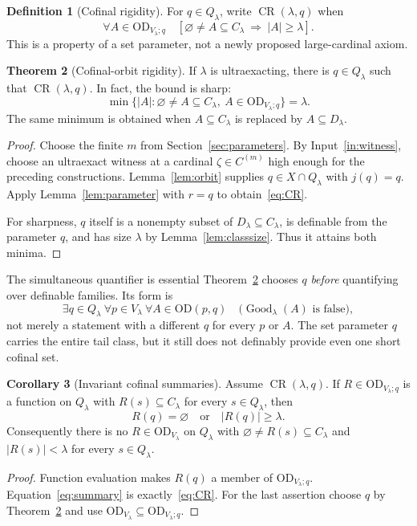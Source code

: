 \documentclass[11pt,letterpaper]{article}
\theoremstyle{definition}
\newtheorem{definition}{Definition}[section]
\newtheorem{theorem}[definition]{Theorem}
\newtheorem{corollary}[definition]{Corollary}
\numberwithin{equation}{section}
\newcommand{\OD}{\mathrm{OD}}
\newcommand{\D}{D_\lambda}
\newcommand{\Q}{Q_\lambda}
\newcommand{\C}{C_\lambda}
\newcommand{\ODlow}{\OD_{V_\lambda}}
\newcommand{\ODq}{\OD_{V_\lambda;q}}
\newcommand{\Good}{\operatorname{Good}}
\newcommand{\Rig}{\operatorname{CR}}
\begin{document}
\begin{definition}[Cofinal rigidity]\label{def:rigid}
For $q\in\Q$, write $\Rig(\lambda,q)$ when
\begin{equation}
\forall A\in\ODq\quad
\left[\varnothing\ne A\subseteq\C\ \Longrightarrow\ |A|\ge\lambda\right].
\label{eq:CR}
\end{equation}
This is a property of a set parameter, not a newly proposed large-cardinal axiom.
\end{definition}

\begin{theorem}[Cofinal-orbit rigidity]\label{thm:rigid}
If $\lambda$ is ultraexacting, there is $q\in\Q$ such that $\Rig(\lambda,q)$. In fact, the bound is sharp:
\begin{equation}
\min\bigl\{|A|:\varnothing\ne A\subseteq\C,\ A\in\ODq\bigr\}
=\lambda.
\label{eq:minimum}
\end{equation}
The same minimum is obtained when $A\subseteq\C$ is replaced by $A\subseteq\D$.
\end{theorem}
\begin{proof}
Choose the finite $m$ from Section~\ref{sec:parameters}. By Input~\ref{in:witness}, choose an ultraexact witness at a cardinal $\zeta\in C^{(m)}$ high enough for the preceding constructions. Lemma~\ref{lem:orbit} supplies $q\in X\cap\Q$ with $j(q)=q$. Apply Lemma~\ref{lem:parameter} with $r=q$ to obtain~\eqref{eq:CR}.

For sharpness, $q$ itself is a nonempty subset of $\D\subseteq\C$, is definable from the parameter $q$, and has size $\lambda$ by Lemma~\ref{lem:classsize}. Thus it attains both minima.
\end{proof}

\begin{assessment}{The simultaneous quantifier is essential}
Theorem~\ref{thm:rigid} chooses $q$ \emph{before} quantifying over definable families. Its form is
\[
\exists q\in\Q\ \forall p\in V_\lambda\ \forall A\in\OD(p,q)\quad
\bigl(\Good_\lambda(A)\text{ is false}\bigr),
\]
not merely a statement with a different $q$ for every $p$ or $A$. The set parameter $q$ carries the entire tail class, but it still does not definably provide even one short cofinal set.
\end{assessment}

\begin{corollary}[Invariant cofinal summaries]\label{cor:summary}
Assume $\Rig(\lambda,q)$. If $R\in\ODq$ is a function on $\Q$ with $R(s)\subseteq\C$ for every $s\in\Q$, then
\begin{equation}
R(q)=\varnothing\quad\text{or}\quad |R(q)|\ge\lambda.
\label{eq:summary}
\end{equation}
Consequently there is no $R\in\ODlow$ on $\Q$ with $\varnothing\ne R(s)\subseteq\C$ and $|R(s)|<\lambda$ for every $s\in\Q$.
\end{corollary}
\begin{proof}
Function evaluation makes $R(q)$ a member of $\ODq$. Equation~\eqref{eq:summary} is exactly~\eqref{eq:CR}. For the last assertion choose $q$ by Theorem~\ref{thm:rigid} and use $\ODlow\subseteq\ODq$.
\end{proof}
\end{document}
